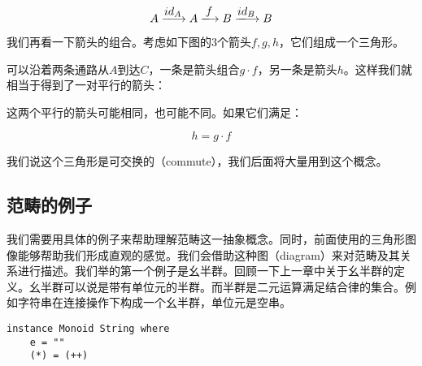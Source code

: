 \documentclass{article}
\begin{document}
\[
A \arrowto{id_A} A \arrowto{f} B \arrowto{id_B} B
\]

我们再看一下箭头的组合。考虑如下图的3个箭头$f, g, h$，它们组成一个三角形。

\begin{center}
\end{center}

可以沿着两条通路从$A$到达$C$，一条是箭头组合$g \cdot f$，另一条是箭头$h$。这样我们就相当于得到了一对平行的箭头：

\begin{center}
\end{center}

这两个平行的箭头可能相同，也可能不同。如果它们满足：

\[
h = g \cdot f
\]

我们说这个三角形是可交换的（commute），我们后面将大量用到这个概念。

\subsection{范畴的例子}

我们需要用具体的例子来帮助理解范畴这一抽象概念。同时，前面使用的三角形图像能够帮助我们形成直观的感觉。我们会借助这种图（diagram）来对范畴及其关系进行描述。我们举的第一个例子是幺半群。回顾一下上一章中关于幺半群的定义。幺半群可以说是带有单位元的半群。而半群是二元运算满足结合律的集合。例如字符串在连接操作下构成一个幺半群，单位元是空串。

\begin{lstlisting}
instance Monoid String where
    e = ""
    (*) = (++)
\end{lstlisting}
\end{document}
